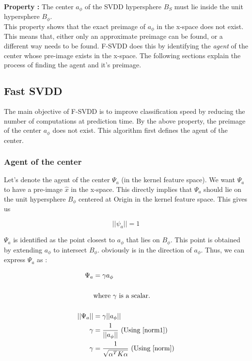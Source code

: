 \documentclass{article} %
\begin{document}
\textbf{Property :} The center $a_\phi$ of the SVDD hypersphere $B_S$ must lie inside the unit hypersphere $B_{\phi}$. \\[10pt]


This property shows that the exact preimage of $a_\phi$ in the x-space does not exist. This means that, either only an approximate preimage can be found, or a different way needs to be found. F-SVDD does this by identifying the \textit{agent} of the center whose pre-image exists in the x-space. The following sections explain the process of finding the agent and it's preimage.


\subsection{Fast SVDD}
The main objective of F-SVDD is to improve classification speed by reducing the number of computations at prediction time. By the above property, the preimage of the center $a_\phi$ does not exist. This algorithm  
first defines the agent of the center.

\subsubsection{Agent of the center}

Let's denote the agent of the center $\Psi_a$ (in the kernel feature space). We want $\Psi_a$ to have a pre-image $\hat{x}$ in the x-space.  This directly implies that $\Psi_a$ should lie on the unit hypersphere  $B_{\phi}$ centered at Origin in the kernel feature space. This gives us  

\begin{equation}\label{norm1}
||\psi_a|| = 1 
\end{equation}

$\Psi_a$ is identified as the point closest to $a_\phi$ that lies on $B_{\phi}$. This point is obtained by  extending $a_\phi$ to intersect $B_\phi$. obviously is in the direction of $a_\phi$.
Thus, we can express $\Psi_a$ as :

\begin{equation}
\begin{split}
\Psi_a &= \gamma a_\phi \\\\
&\text{where } \gamma  \text{ is a scalar.} \\ \\
||\Psi_a|| &= \gamma ||a_\phi||  \\
\gamma &= \frac{1}{||a_\phi||}  \text{  (Using  \ref{norm1})} \\ 
\gamma &= \frac{1}{\sqrt{\alpha^T K \alpha}} \text{  (Using  \ref{norm})} 
\end{split}
\end{equation}
\end{document}
